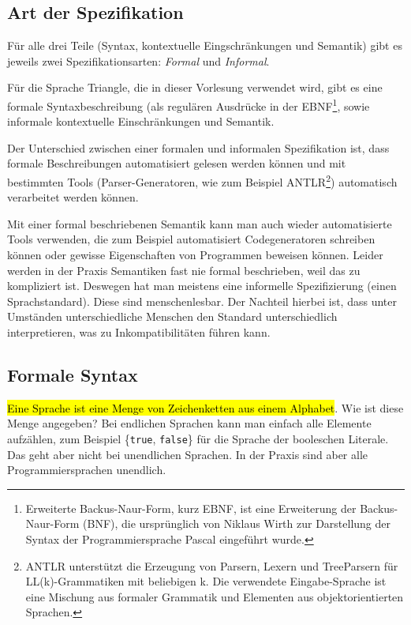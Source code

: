 \documentclass[ngerman,abstract=true]{scrartcl}
\begin{document}
\subsection{Art der Spezifikation}

Für alle drei Teile (Syntax, kontextuelle Eingschränkungen und Semantik) gibt es jeweils zwei Spezifikationsarten: \emph{Formal} und \emph{Informal}.

Für die Sprache Triangle, die in dieser Vorlesung verwendet wird, gibt es eine formale Syntaxbeschreibung (als regulären Ausdrücke in der EBNF\footnote{Erweiterte Backus-Naur-Form, kurz EBNF, ist eine Erweiterung der Backus-Naur-Form (BNF), die ursprünglich von Niklaus Wirth zur Darstellung der Syntax der Programmiersprache Pascal eingeführt wurde.}, sowie informale kontextuelle Einschränkungen und Semantik.

Der Unterschied zwischen einer formalen und informalen Spezifikation ist, dass formale Beschreibungen automatisiert gelesen werden können und mit bestimmten Tools (Parser-Generatoren, wie zum Beispiel ANTLR\footnote{ANTLR unterstützt die Erzeugung von Parsern, Lexern und TreeParsern für LL(k)-Grammatiken mit beliebigen k. Die verwendete Eingabe-Sprache ist eine Mischung aus formaler Grammatik und Elementen aus objektorientierten Sprachen.}) automatisch verarbeitet werden können. 

Mit einer formal beschriebenen Semantik kann man auch wieder automatisierte Tools verwenden, die zum Beispiel automatisiert Codegeneratoren schreiben können oder gewisse Eigenschaften von Programmen beweisen können. Leider werden in der Praxis Semantiken fast nie formal beschrieben, weil das zu kompliziert ist. Deswegen hat man meistens eine informelle Spezifizierung (einen Sprachstandard). Diese sind menschenlesbar. Der Nachteil hierbei ist, dass unter Umständen unterschiedliche Menschen den Standard unterschiedlich interpretieren, was zu Inkompatibilitäten führen kann. 

\subsection{Formale Syntax}

\hl{Eine Sprache ist eine Menge von Zeichenketten aus einem Alphabet}. Wie ist diese Menge angegeben? Bei endlichen Sprachen kann man einfach alle Elemente aufzählen, zum Beispiel \{\verb|true|, \verb|false|\} für die Sprache der booleschen Literale. Das geht aber nicht bei unendlichen Sprachen. In der Praxis sind aber alle Programmiersprachen unendlich.
\end{document}
